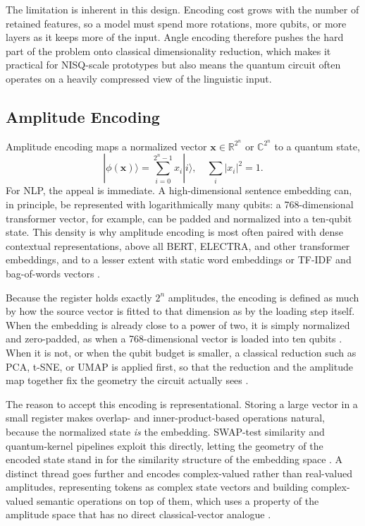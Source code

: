 \documentclass{ieeeaccess}
\begin{document}
The limitation is inherent in this design. Encoding cost grows with the number of retained features, so a model must spend more rotations, more qubits, or more layers as it keeps more of the input. Angle encoding therefore pushes the hard part of the problem onto classical dimensionality reduction, which makes it practical for NISQ-scale prototypes but also means the quantum circuit often operates on a heavily compressed view of the linguistic input.

\subsection{Amplitude Encoding}
\label{subsec:amplitude_encoding}

Amplitude encoding maps a normalized vector $\mathbf{x} \in \mathbb{R}^{2^n}$ or $\mathbb{C}^{2^n}$ to a quantum state,
\begin{equation}
|\phi(\mathbf{x})\rangle = \sum_{i=0}^{2^n-1} x_i |i\rangle,
\quad \sum_i |x_i|^2 = 1.
\end{equation}
For NLP, the appeal is immediate. A high-dimensional sentence embedding can, in principle, be represented with logarithmically many qubits: a 768-dimensional transformer vector, for example, can be padded and normalized into a ten-qubit state. This density is why amplitude encoding is most often paired with dense contextual representations, above all BERT, ELECTRA, and other transformer embeddings, and to a lesser extent with static word embeddings or TF-IDF and bag-of-words vectors \cite{buonaiuto_quantum_2024,guarasci_applying_2025,cavar_old_2026,zeguendry_quantum_2024}.

Because the register holds exactly $2^n$ amplitudes, the encoding is defined as much by how the source vector is fitted to that dimension as by the loading step itself. When the embedding is already close to a power of two, it is simply normalized and zero-padded, as when a 768-dimensional vector is loaded into ten qubits \cite{guarasci_applying_2025,buonaiuto_multilingual_2025}. When it is not, or when the qubit budget is smaller, a classical reduction such as PCA, t-SNE, or UMAP is applied first, so that the reduction and the amplitude map together fix the geometry the circuit actually sees \cite{korrapati_quantum_2025,zhang_entangled_2024,tufchi_quantum-enhanced_2026}.

The reason to accept this encoding is representational. Storing a large vector in a small register makes overlap- and inner-product-based operations natural, because the normalized state \emph{is} the embedding. SWAP-test similarity and quantum-kernel pipelines exploit this directly, letting the geometry of the encoded state stand in for the similarity structure of the embedding space \cite{cavar_word_2025,zeguendry_quantum_2024,schuld2019quantum}. A distinct thread goes further and encodes complex-valued rather than real-valued amplitudes, representing tokens as complex state vectors and building complex-valued semantic operations on top of them, which uses a property of the amplitude space that has no direct classical-vector analogue \cite{routh_quantum_2026,cavar_old_2026}.
\end{document}
